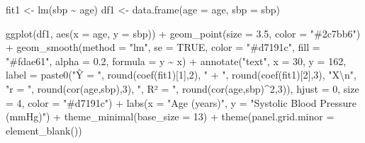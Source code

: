 \documentclass[
  12pt,
  letterpaper,
]{book}
\newenvironment{Shaded}{\begin{snugshade}}{\end{snugshade}}
\newcommand{\AttributeTok}[1]{\textcolor[rgb]{0.40,0.45,0.13}{#1}}
\newcommand{\ConstantTok}[1]{\textcolor[rgb]{0.56,0.35,0.01}{#1}}
\newcommand{\DecValTok}[1]{\textcolor[rgb]{0.68,0.00,0.00}{#1}}
\newcommand{\FloatTok}[1]{\textcolor[rgb]{0.68,0.00,0.00}{#1}}
\newcommand{\FunctionTok}[1]{\textcolor[rgb]{0.28,0.35,0.67}{#1}}
\newcommand{\NormalTok}[1]{\textcolor[rgb]{0.00,0.23,0.31}{#1}}
\newcommand{\OtherTok}[1]{\textcolor[rgb]{0.00,0.23,0.31}{#1}}
\newcommand{\SpecialCharTok}[1]{\textcolor[rgb]{0.37,0.37,0.37}{#1}}
\newcommand{\StringTok}[1]{\textcolor[rgb]{0.13,0.47,0.30}{#1}}
\begin{document}
\begin{Shaded}
\begin{Highlighting}[]
\NormalTok{fit1 }\OtherTok{\textless{}{-}} \FunctionTok{lm}\NormalTok{(sbp }\SpecialCharTok{\textasciitilde{}}\NormalTok{ age)}
\NormalTok{df1  }\OtherTok{\textless{}{-}} \FunctionTok{data.frame}\NormalTok{(}\AttributeTok{age =}\NormalTok{ age, }\AttributeTok{sbp =}\NormalTok{ sbp)}

\FunctionTok{ggplot}\NormalTok{(df1, }\FunctionTok{aes}\NormalTok{(}\AttributeTok{x =}\NormalTok{ age, }\AttributeTok{y =}\NormalTok{ sbp)) }\SpecialCharTok{+}
  \FunctionTok{geom\_point}\NormalTok{(}\AttributeTok{size =} \FloatTok{3.5}\NormalTok{, }\AttributeTok{color =} \StringTok{"\#2c7bb6"}\NormalTok{) }\SpecialCharTok{+}
  \FunctionTok{geom\_smooth}\NormalTok{(}\AttributeTok{method =} \StringTok{"lm"}\NormalTok{, }\AttributeTok{se =} \ConstantTok{TRUE}\NormalTok{, }\AttributeTok{color =} \StringTok{"\#d7191c"}\NormalTok{,}
              \AttributeTok{fill =} \StringTok{"\#fdae61"}\NormalTok{, }\AttributeTok{alpha =} \FloatTok{0.2}\NormalTok{, }\AttributeTok{formula =}\NormalTok{ y }\SpecialCharTok{\textasciitilde{}}\NormalTok{ x) }\SpecialCharTok{+}
  \FunctionTok{annotate}\NormalTok{(}\StringTok{"text"}\NormalTok{, }\AttributeTok{x =} \DecValTok{30}\NormalTok{, }\AttributeTok{y =} \DecValTok{162}\NormalTok{,}
           \AttributeTok{label =} \FunctionTok{paste0}\NormalTok{(}\StringTok{"Ŷ = "}\NormalTok{, }\FunctionTok{round}\NormalTok{(}\FunctionTok{coef}\NormalTok{(fit1)[}\DecValTok{1}\NormalTok{],}\DecValTok{2}\NormalTok{),}
                          \StringTok{" + "}\NormalTok{, }\FunctionTok{round}\NormalTok{(}\FunctionTok{coef}\NormalTok{(fit1)[}\DecValTok{2}\NormalTok{],}\DecValTok{3}\NormalTok{), }\StringTok{"X}\SpecialCharTok{\textbackslash{}n}\StringTok{"}\NormalTok{,}
                          \StringTok{"r = "}\NormalTok{, }\FunctionTok{round}\NormalTok{(}\FunctionTok{cor}\NormalTok{(age,sbp),}\DecValTok{3}\NormalTok{),}
                          \StringTok{",  R² = "}\NormalTok{, }\FunctionTok{round}\NormalTok{(}\FunctionTok{cor}\NormalTok{(age,sbp)}\SpecialCharTok{\^{}}\DecValTok{2}\NormalTok{,}\DecValTok{3}\NormalTok{)),}
           \AttributeTok{hjust =} \DecValTok{0}\NormalTok{, }\AttributeTok{size =} \DecValTok{4}\NormalTok{, }\AttributeTok{color =} \StringTok{"\#d7191c"}\NormalTok{) }\SpecialCharTok{+}
  \FunctionTok{labs}\NormalTok{(}\AttributeTok{x =} \StringTok{"Age (years)"}\NormalTok{, }\AttributeTok{y =} \StringTok{"Systolic Blood Pressure (mmHg)"}\NormalTok{) }\SpecialCharTok{+}
  \FunctionTok{theme\_minimal}\NormalTok{(}\AttributeTok{base\_size =} \DecValTok{13}\NormalTok{) }\SpecialCharTok{+}
  \FunctionTok{theme}\NormalTok{(}\AttributeTok{panel.grid.minor =} \FunctionTok{element\_blank}\NormalTok{())}
\end{Highlighting}
\end{Shaded}
\end{document}
